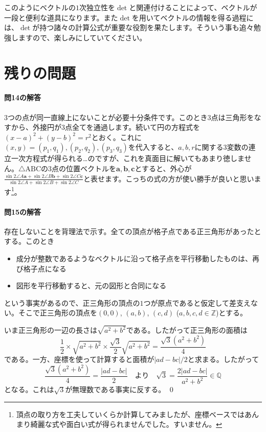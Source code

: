 このようにベクトルの$1$次独立性を$\det$と関連付けることによって、ベクトルが一段と便利な道具になります。また$\det$を用いてベクトルの情報を得る過程には、$\det$が持つ諸々の計算公式が重要な役割を果たします。そういう事も追々勉強しますので、楽しみにしていてください。

\section{残りの問題}

\paragraph{問14の解答} $3$つの点が同一直線上にないことが必要十分条件です。このとき$3$点は三角形をなすから、外接円が$3$点全てを通過します。続いて円の方程式を$(x-a)^2  + (y-b)^2 = r^2$とおく。これに$(x, y) = (p_1, q_1), (p_2, q_2), (p_3, q_3)$を代入すると、$a, b, r$に関する$3$変数の連立一次方程式が得られる…のですが、これを真面目に解いてもあまり徳しません。$\triangle\mathrm{ABC}$の$3$点の位置ベクトルを$\bm{a},\bm{b},\bm{c}$とすると、外心が$\displaystyle \frac{\sin 2\angle A \bm{a} + \sin 2\angle B \bm{b} + \sin 2\angle C \bm{c}}{\sin2\angle A + \sin 2\angle B + \sin 2 \angle C}$と表せます。こっちの式の方が使い勝手が良いと思います\footnote{頂点の取り方を工夫していくらか計算してみましたが、座標ベースではあんまり綺麗な式や面白い式が得られませんでした。すいません。}。

\paragraph{問15の解答}

存在しないことを背理法で示す。全ての頂点が格子点である正三角形があったとする。このとき
\begin{itemize}
\item 成分が整数であるようなベクトルに沿って格子点を平行移動したものは、再び格子点になる
\item 図形を平行移動すると、元の図形と合同になる
\end{itemize}
という事実があるので、正三角形の頂点の$1$つが原点であると仮定して差支えない。そこで正三角形の頂点を$(0,0)$, $(a,b)$, $(c,d)$ ($a,b,c,d\in\mathbb{Z}$)とする。

いま正三角形の一辺の長さは$\sqrt{a^2+b^2}$である。したがって正三角形の面積は
\[
\frac{1}{2}\times \sqrt{a^2+b^2} \times \frac{\sqrt{3}}{2}\sqrt{a^2+b^2} = \frac{\sqrt{3}(a^2+b^2)}{4}
\]
である。一方、座標を使って計算すると面積が$|ad-bc|/2$と求まる。したがって
\[
\frac{\sqrt{3}(a^2+b^2)}{4} = \frac{|ad-bc|}{2} \quad \text{より} \quad \sqrt{3} = \frac{2|ad-bc|}{a^2+b^2} \in \mathbb{Q}
\]
となる。これは$\sqrt{3}$が無理数である事実に反する。 \qed

